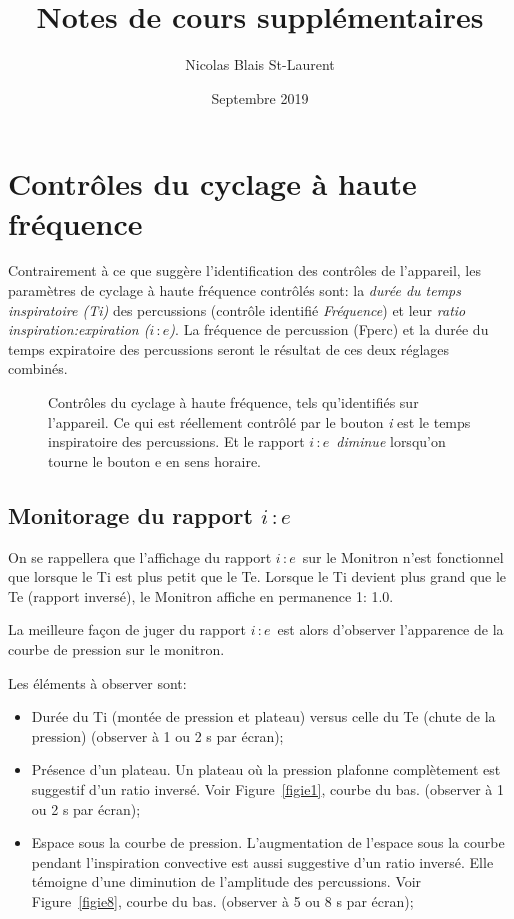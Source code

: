 \documentclass[letterpaper, titlepage]{article}
\title{Notes de cours supplémentaires}
\author{Nicolas Blais St-Laurent}
\date{Septembre 2019}
\def\ie{$i\, \colon e$}
\begin{document}


\section{Contrôles du cyclage à haute fréquence}

Contrairement à ce que suggère l'identification des contrôles de l'appareil, les
paramètres de cyclage à haute fréquence contrôlés sont: la \emph{durée du
temps inspiratoire (Ti)} des percussions (contrôle identifié
\emph{Fréquence}) et leur \emph{ratio inspiration\hspace{0.5em}:\hspace{0.3em}expiration (\ie)}. La
fréquence de percussion (Fperc) et la durée du temps expiratoire des
percussions seront le résultat de ces deux réglages combinés.

\begin{figure}[b]
	\centering
	
	\caption{Contrôles du cyclage à haute fréquence, tels qu'identifiés sur l'appareil. Ce qui est réellement contrôlé par le bouton {\em i} est le temps inspiratoire des percussions. Et le rapport \ie\ {\em diminue} lorsqu'on tourne le bouton e en sens horaire.}
\end{figure}



\subsection{Monitorage du rapport \ie}

On se rappellera que l'affichage du rapport \ie\ sur le Monitron n'est
fonctionnel que lorsque le Ti est plus petit que le Te. Lorsque le Ti
devient plus grand que le Te (rapport inversé), le Monitron affiche en
permanence 1\string: 1.0.

La meilleure façon de juger du rapport \ie\ est alors d'observer
l'apparence de la courbe de pression sur le monitron.

Les éléments à observer sont:

\begin{itemize}
\item
  Durée du Ti (montée de pression et plateau) versus celle du Te (chute
  de la pression) (observer à 1 ou 2 s par écran);
\item
  Présence d'un plateau. Un plateau où la pression plafonne complètement
		est suggestif d'un ratio inversé. Voir Figure~\ref{figie1}, courbe du bas.
  (observer à 1 ou 2 s par écran);
\item
  Espace sous la courbe de pression. L'augmentation de l'espace sous la
  courbe pendant l'inspiration convective est aussi suggestive d'un
  ratio inversé. Elle témoigne d'une diminution de l'amplitude des
  percussions. Voir Figure~\ref{figie8}, courbe du bas. (observer à 5 ou 8 s par
  écran);
\end{itemize}
\end{document}
